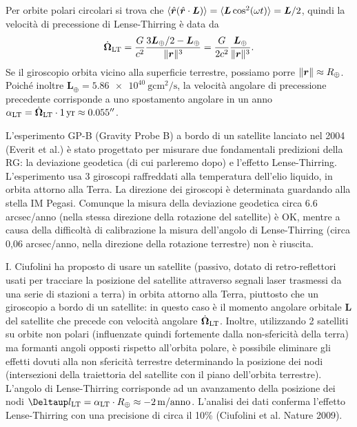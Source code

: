 Per orbite polari circolari si trova che $\langle \hat{\bm{r}}(\hat{\bm{r}} \cdot
\bm{L})\rangle = \langle \bm{L} \cos^{2}(\omega t)\rangle = \bm{L}/2$, quindi la
velocità di precessione di Lense-Thirring è data da
\begin{equation}
  \dot{\bm{\Omega}}_{\textup{LT}} = \frac{G}{c^{2}} \frac{3\bm{L}_{\oplus}/2 -
    \bm{L}_{\oplus}}{\lVert\bm{r}\rVert^{3}} = \frac{G}{2c^{2}}
  \frac{\bm{L}_{\oplus}}{\lVert\bm{r}\rVert^{3}}.
\end{equation}
Se il giroscopio orbita vicino alla superficie terrestre, possiamo porre
$\lVert\bm{r}\rVert \approx R_{\oplus}$.  Poiché inoltre $\bm{L}_{\oplus} =
\SI{5.86e40}{\gram \centi\metre\squared \per\second}$, la velocità angolare di
precessione precedente corrisponde a uno spostamento angolare in un anno
$\alpha_{\textup{LT}} = \dot{\bm{\Omega}}_{\textup{LT}} \cdot \SI{1}{yr} \approx
\SI{0.055}{\arcsecond}$.

L'esperimento GP-B (Gravity Probe B) a bordo di un satellite lanciato nel 2004
(Everit et al.) è stato progettato per misurare due fondamentali predizioni
della RG: la deviazione geodetica (di cui parleremo dopo) e l'effetto
Lense-Thirring.  L'esperimento usa 3 giroscopi raffreddati alla temperatura
dell'elio liquido, in orbita attorno alla Terra.  La direzione dei giroscopi è
determinata guardando alla stella IM Pegasi.  Comunque la misura della
deviazione geodetica circa 6.6 arcsec/anno (nella stessa direzione della
rotazione del satellite) è OK, mentre a causa della difficoltà di calibrazione
la misura dell'angolo di Lense-Thirring (circa 0,06 arcsec/anno, nella direzione
della rotazione terrestre) non è riuscita.

I. Ciufolini ha proposto di usare un satellite (passivo, dotato di
retro-reflettori usati per tracciare la posizione del satellite attraverso
segnali laser trasmessi da una serie di stazioni a terra) in orbita attorno alla
Terra, piuttosto che un giroscopio a bordo di un satellite: in questo caso è il
momento angolare orbitale $\bm{L}$ del satellite che precede con velocità
angolare $\dot{\bm{\Omega}}_{\textup{LT}}$.  Inoltre, utilizzando 2 satelliti su
orbite non polari (influenzate quindi fortemente dalla non-sfericità della
terra) ma formanti angoli opposti rispetto all'orbita polare, è possibile
eliminare gli effetti dovuti alla non sfericità terrestre determinando la
posizione dei nodi (intersezioni della traiettoria del satellite con il piano
dell'orbita terrestre).  L'angolo di Lense-Thirring corrisponde ad un
avanzamento della posizione dei nodi $\var l_{\textup{LT}} =
\alpha_{\textup{LT}} \cdot R_{\oplus} \approx -\SI{2}{\metre/anno}$.  L'analisi
dei dati conferma l'effetto Lense-Thirring con una precisione di circa il 10\%
(Ciufolini et al. Nature 2009).

